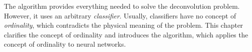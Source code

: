 The \dsea algorithm provides everything needed to solve the deconvolution problem.
However,
it uses an arbitrary \emph{classifier}.
Usually,
  classifiers have no concept of \emph{ordinality},
which contradicts the physical meaning of the problem.
%
This chapter
  clarifies the concept of ordinality
  and
  introduces the \corn algorithm,
    which applies the concept of ordinality to neural networks.
